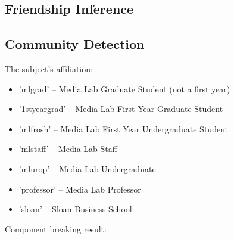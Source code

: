 \documentclass[11pt]{article}
\begin{document}
\subsection{Friendship Inference}

\subsection{Community Detection}
The subject’s affiliation:
\begin{itemize}
\item 'mlgrad' – Media Lab Graduate Student (not a first year) 
\item '1styeargrad' – Media Lab First Year Graduate Student 
\item 'mlfrosh' – Media Lab First Year Undergraduate Student 
\item 'mlstaff' – Media Lab Staff
\item 'mlurop' – Media Lab Undergraduate
\item 'professor' – Media Lab Professor
\item 'sloan' – Sloan Business School
\end{itemize}
Component breaking result:
\end{document}
